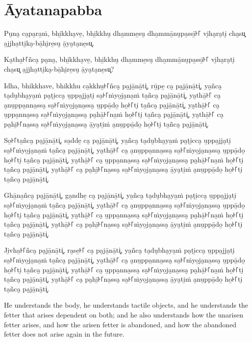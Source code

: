 \paliPage
\section*{Āyatanapabba}

Pu̮na̮ ca̮pa̮ra̱ṁ, bhi̱kkha̮ve̱, bhi̱kkhu̮ dha̱mme̱su̮ dha̱mmā̱nu̮pa̱ssī̱꜔꜒ vi̮ha̮ra̮ti̮ cha̮su͓
a̱jjha̱tti̮ka̮-bā̱hi̮re̱su̮ ā̱ya̮ta̮ne̱su͓.

Ka̮tha̱꜔꜒ñca̮ pa̮na̮, bhi̱kkha̮ve̱, bhi̱kkhu̮ dha̱mme̱su̮ dha̱mmā̱nu̮pa̱ssī̱꜔꜒ vi̮ha̮ra̮ti̮ cha̮su͓
a̱jjha̱tti̮ka̮-bā̱hi̮re̱su̮ ā̱ya̮ta̮ne̱su͓?

Idha, bhikkhave, bhikkhu
ca̱kkhu̱꜔꜒ñca̮ pa̮jā̱nā̱ti͓,
rū̱pe̱ ca̮ pa̮jā̱nā̱ti͓,
ya̱ñca̮ ta̮du̮bha̮ya̱ṁ pa̮ṭi̱cca̮ u̱ppa̱jja̮ti̮ sa̱꜔꜒ṁyo̱ja̮na̱ṁ ta̱ñca̮ pa̮jā̱nā̱ti͓,
ya̮thā̱꜔꜒ ca̮ a̮nu̱ppa̱nna̱ssa̮ sa̱꜔꜒ṁyo̱ja̮na̱ssa̮ u̱ppā̱do̱ ho̱꜔꜒ti̮ ta̱ñca̮ pa̮jā̱nā̱ti͓,
ya̮thā̱꜔꜒ ca̮ u̱ppa̱nna̱ssa̮ sa̱꜔꜒ṁyo̱ja̮na̱ssa̮ pa̮hā̱꜔꜒na̱ṁ ho̱꜔꜒ti̮ ta̱ñca̮ pa̮jā̱nā̱ti͓,
ya̮thā̱꜔꜒ ca̮ pa̮hī̱꜔꜒na̱ssa̮ sa̱꜔꜒ṁyo̱ja̮na̱ssa̮ ā̱ya̮ti̱ṁ a̮nu̱ppā̱do̱ ho̱꜔꜒ti̮ ta̱ñca̮ pa̮jā̱nā̱ti͓.

So̱꜔꜒ta̱ñca̮ pa̮jā̱nā̱ti͓,
sa̱dde̱ ca̮ pa̮jā̱nā̱ti͓,
ya̱ñca̮ ta̮du̮bha̮ya̱ṁ pa̮ṭi̱cca̮ u̱ppa̱jja̮ti̮ sa̱꜔꜒ṁyo̱ja̮na̱ṁ ta̱ñca̮ pa̮jā̱nā̱ti͓,
ya̮thā̱꜔꜒ ca̮ a̮nu̱ppa̱nna̱ssa̮ sa̱꜔꜒ṁyo̱ja̮na̱ssa̮ u̱ppā̱do̱ ho̱꜔꜒ti̮ ta̱ñca̮ pa̮jā̱nā̱ti͓,
ya̮thā̱꜔꜒ ca̮ u̱ppa̱nna̱ssa̮ sa̱꜔꜒ṁyo̱ja̮na̱ssa̮ pa̮hā̱꜔꜒na̱ṁ ho̱꜔꜒ti̮ ta̱ñca̮ pa̮jā̱nā̱ti͓,
ya̮thā̱꜔꜒ ca̮ pa̮hī̱꜔꜒na̱ssa̮ sa̱꜔꜒ṁyo̱ja̮na̱ssa̮ ā̱ya̮ti̱ṁ a̮nu̱ppā̱do̱ ho̱꜔꜒ti̮ ta̱ñca̮ pa̮jā̱nā̱ti͓.

Ghā̱na̱ñca̮ pa̮jā̱nā̱ti͓,
ga̱ndhe̱ ca̮ pa̮jā̱nā̱ti͓,
ya̱ñca̮ ta̮du̮bha̮ya̱ṁ pa̮ṭi̱cca̮ u̱ppa̱jja̮ti̮ sa̱꜔꜒ṁyo̱ja̮na̱ṁ ta̱ñca̮ pa̮jā̱nā̱ti͓,
ya̮thā̱꜔꜒ ca̮ a̮nu̱ppa̱nna̱ssa̮ sa̱꜔꜒ṁyo̱ja̮na̱ssa̮ u̱ppā̱do̱ ho̱꜔꜒ti̮ ta̱ñca̮ pa̮jā̱nā̱ti͓,
ya̮thā̱꜔꜒ ca̮ u̱ppa̱nna̱ssa̮ sa̱꜔꜒ṁyo̱ja̮na̱ssa̮ pa̮hā̱꜔꜒na̱ṁ ho̱꜔꜒ti̮ ta̱ñca̮ pa̮jā̱nā̱ti͓,
ya̮thā̱꜔꜒ ca̮ pa̮hī̱꜔꜒na̱ssa̮ sa̱꜔꜒ṁyo̱ja̮na̱ssa̮ ā̱ya̮ti̱ṁ a̮nu̱ppā̱do̱ ho̱꜔꜒ti̮ ta̱ñca̮ pa̮jā̱nā̱ti͓.

Ji̱vha̱꜔꜒ñca̮ pa̮jā̱nā̱ti͓,
ra̮se̱꜔꜒ ca̮ pa̮jā̱nā̱ti͓,
ya̱ñca̮ ta̮du̮bha̮ya̱ṁ pa̮ṭi̱cca̮ u̱ppa̱jja̮ti̮ sa̱꜔꜒ṁyo̱ja̮na̱ṁ ta̱ñca̮ pa̮jā̱nā̱ti͓,
ya̮thā̱꜔꜒ ca̮ a̮nu̱ppa̱nna̱ssa̮ sa̱꜔꜒ṁyo̱ja̮na̱ssa̮ u̱ppā̱do̱ ho̱꜔꜒ti̮ ta̱ñca̮ pa̮jā̱nā̱ti͓,
ya̮thā̱꜔꜒ ca̮ u̱ppa̱nna̱ssa̮ sa̱꜔꜒ṁyo̱ja̮na̱ssa̮ pa̮hā̱꜔꜒na̱ṁ ho̱꜔꜒ti̮ ta̱ñca̮ pa̮jā̱nā̱ti͓,
ya̮thā̱꜔꜒ ca̮ pa̮hī̱꜔꜒na̱ssa̮ sa̱꜔꜒ṁyo̱ja̮na̱ssa̮ ā̱ya̮ti̱ṁ a̮nu̱ppā̱do̱ ho̱꜔꜒ti̮ ta̱ñca̮ pa̮jā̱nā̱ti͓.

\englishPage

He understands the body, he understands tactile objects, and he understands the
fetter that arises dependent on both; and he also understands how the unarisen
fetter arises, and how the arisen fetter is abandoned, and how the abandoned
fetter does not arise again in the future.

